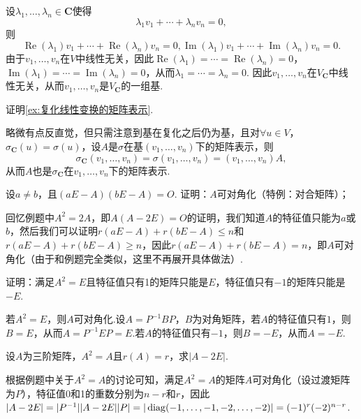 \begin{exercise}
\begin{exgroup}
\begin{answer}
            设$\lambda_1,\ldots,\lambda_n\in\mathbf{C}$使得
            \[\lambda_1 v_1+\cdots+\lambda_n v_n=0,\]
            则\[\operatorname{Re}(\lambda_1)v_1+\cdots+\operatorname{Re}(\lambda_n)v_n=0,\operatorname{Im}(\lambda_1)v_1+\cdots+\operatorname{Im}(\lambda_n)v_n=0.\]
            由于$v_1,\ldots,v_n$在$V$中线性无关，因此$\operatorname{Re}(\lambda_1)=\cdots=\operatorname{Re}(\lambda_n)=0$，$\operatorname{Im}(\lambda_1)=\cdots=\operatorname{Im}(\lambda_n)=0$，从而$\lambda_1=\cdots=\lambda_n=0$. 因此$v_1,\ldots,v_n$在$V_{\mathbf{C}}$中线性无关，从而$v_1,\ldots,v_n$是$V_{\mathbf{C}}$的一组基.
        \end{answer}
        \item 证明\autoref{ex:复化线性变换的矩阵表示}.
        \begin{answer}
            略微有点反直觉，但只需注意到基在复化之后仍为基，且对$\forall u\in V$，$\sigma_{\mathbf{C}}(u)=\sigma(u)$，设$A$是$\sigma$在基$(v_1,\ldots,v_n)$下的矩阵表示，则\[\sigma_{\mathbf{C}}(v_1,\ldots,v_n)=\sigma(v_1,\ldots,v_n)=(v_1,\ldots,v_n)A,\]
            从而$A$也是$\sigma_{\mathbf{C}}$在$v_1,\ldots,v_n$下的矩阵表示.
        \end{answer}
    \end{exgroup}

    \begin{exgroup}
        \item 设$a\neq b$，且$(aE-A)(bE-A)=O$. 证明：$A$可对角化（特例：对合矩阵）；
        \begin{answer}
            回忆例题中$A^2=2A$，即$A(A-2E)=O$的证明，我们知道$A$的特征值只能为$a$或$b$，然后我们可以证明$r(aE-A)+r(bE-A)\leqslant n$和$r(aE-A)+r(bE-A)\geqslant n$，因此$r(aE-A)+r(bE-A)=n$，即$A$可对角化（由于和例题完全类似，这里不再展开具体做法）.
        \end{answer}

        \item 证明：满足$A^2=E$且特征值只有1的矩阵只能是$E$，特征值只有$-1$的矩阵只能是$-E$.
        \begin{answer}
            若$A^2=E$，则$A$可对角化.设$A=P^{-1}BP$，$B$为对角矩阵，若$A$的特征值只有$1$，则$B=E$，从而$A=P^{-1}EP=E$.若$A$的特征值只有$-1$，则$B=-E$，从而$A=-E$.
        \end{answer}

        \item 设$A$为三阶矩阵，$A^2=A$且$r(A)=r$，求$|A-2E|$.
        \begin{answer}
            根据例题中关于$A^2=A$的讨论可知，满足$A^2=A$的矩阵$A$可对角化（设过渡矩阵为$P$），特征值0和1的重数分别为$n-r$和$r$，因此$|A-2E|=|P^{-1}||A-2E||P|=|\operatorname{diag}(-1,\ldots,-1,-2,\ldots,-2)|=(-1)^r(-2)^{n-r}$.
        \end{answer}


\end{exgroup}
\end{exercise}
